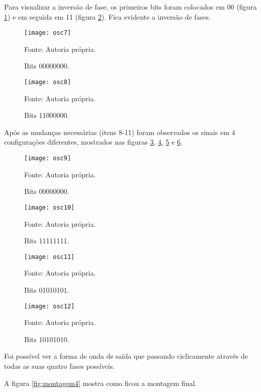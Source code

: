 Para visualizar a inversão de fase, os primeiros bits foram colocados em 00 (figura \ref{fig:osc7}) e em seguida em 11 (figura \ref{fig:osc8}). Fica evidente a inversão de fases.

\begin{figure}[H]
  \centering
  \caption{Bits 00000000.}
  \texttt{[image: osc7]}
  
  \small Fonte: Autoria própria.
  \label{fig:osc7}
\end{figure}

\begin{figure}[H]
  \centering
  \caption{Bits 11000000.}
  \texttt{[image: osc8]}
  
  \small Fonte: Autoria própria.
  \label{fig:osc8}
\end{figure}

Após as mudanças necessárias (itens 8-11) foram observados os sinais em 4 configurações diferentes, mostrados nas figuras \ref{fig:osc9}, \ref{fig:osc10}, \ref{fig:osc11} e \ref{fig:osc12}.

\begin{figure}[H]
  \centering
  \caption{Bits 00000000.}
  \texttt{[image: osc9]}
  
  \small Fonte: Autoria própria.
  \label{fig:osc9}
\end{figure}

\begin{figure}[H]
  \centering
  \caption{Bits 11111111.}
  \texttt{[image: osc10]}
  
  \small Fonte: Autoria própria.
  \label{fig:osc10}
\end{figure}

\begin{figure}[H]
  \centering
  \caption{Bits 01010101.}
  \texttt{[image: osc11]}
  
  \small Fonte: Autoria própria.
  \label{fig:osc11}
\end{figure}

\begin{figure}[H]
  \centering
  \caption{Bits 10101010.}
  \texttt{[image: osc12]}
  
  \small Fonte: Autoria própria.
  \label{fig:osc12}
\end{figure}

Foi possível ver a forma de onda de saída que passando ciclicamente através de todas as suas quatro fases possíveis.

A figura \ref{fig:montagem4} mostra como ficou a montagem final.

